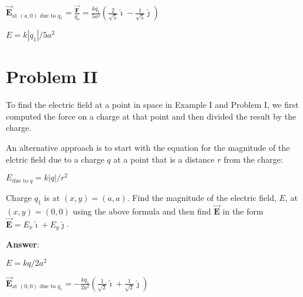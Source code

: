 \documentclass{article}
\newcommand{\ds}[0]{\displaystyle}
\newcommand{\ihat}[0]{\hat{\boldsymbol{\imath}}}
\newcommand{\jhat}[0]{\hat{\boldsymbol{\jmath}}}
\newcommand{\bfvec}[1]{\vec{\mathbf{#1}}}
\begin{document}
$\ds\bfvec{E}_{\text{at }(a,0) \text{ due to }q_1} = \frac{\bfvec{F}}{q_o}=\frac{kq_1}{5a^2}\left(\frac{2}{\sqrt{5}}\ihat -\frac{1}{\sqrt{5}}\jhat\right)$

$E = k|q_1|/5a^2$
\else


\fi

\newpage

\section{Problem II}

To find the electric field at a point in space in Example I and Problem I, we first computed the force on a charge at that point and then divided the result by the charge.

An alternative approach is to start with the equation for the magnitude of the elctric field due to a charge $q$ at a point that is a distance $r$ from the charge:

$E_{\text{due to }q}=k{|q|}/{r^2}$

Charge $q_1$ is at $(x,y)=(a, a)$. Find the magnitude of the electric field, $E$, at $(x,y)=(0, 0)$ using the above formula and then find $\bfvec{E}$ in the form $\bfvec{E}=E_x\ihat + E_y\jhat$.

\ifsolutions
{\bf Answer}:

$E = kq/2a^2$

$\ds\bfvec{E}_{\text{at }(0,0) \text{ due to }q_1}=-\frac{kq_1}{2a^2}\left(\frac{1}{\sqrt{2}}\ihat +\frac{1}{\sqrt{2}}\jhat\right)$
\else


\fi
\end{document}
